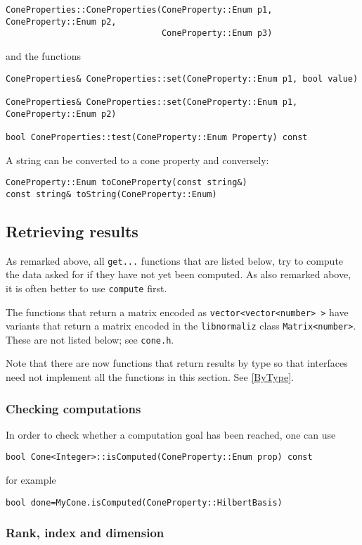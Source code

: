\documentclass[12pt,a4paper]{scrartcl}
\theoremstyle{definition}
\begin{document}
\begin{small}
\begin{Verbatim}
ConeProperties::ConeProperties(ConeProperty::Enum p1, ConeProperty::Enum p2,
                               ConeProperty::Enum p3)
\end{Verbatim}
and the functions
\begin{Verbatim}
ConeProperties& ConeProperties::set(ConeProperty::Enum p1, bool value)

ConeProperties& ConeProperties::set(ConeProperty::Enum p1, ConeProperty::Enum p2)

bool ConeProperties::test(ConeProperty::Enum Property) const
\end{Verbatim}

A string can be converted to a cone property and conversely:
\begin{Verbatim}
ConeProperty::Enum toConeProperty(const string&)
const string& toString(ConeProperty::Enum)
\end{Verbatim}


\subsection{Retrieving results}

As remarked above, all \verb|get...| functions that are listed below, try to compute the data asked for if they have not yet been computed. As also remarked above, it is often better to use \verb|compute| first.

The functions that return a matrix encoded as \verb|vector<vector<number> >| have variants that return a matrix encoded in the \verb|libnormaliz| class \verb|Matrix<number>|. These are not listed below; see \verb|cone.h|. 

Note that there are now functions that return results by type so that interfaces need not implement all the functions in this section. See \ref{ByType}.

\subsubsection{Checking computations}
In order to check whether a computation goal has been reached, one can use
\begin{Verbatim}
bool Cone<Integer>::isComputed(ConeProperty::Enum prop) const 
\end{Verbatim}
for example
\begin{Verbatim}
bool done=MyCone.isComputed(ConeProperty::HilbertBasis)
\end{Verbatim}

\subsubsection{Rank, index and dimension}


\end{small}
\end{document}
